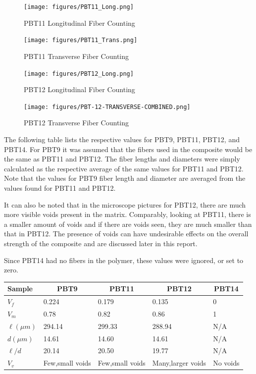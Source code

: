 \documentclass[11pt]{article}
\begin{document}
\begin{figure}[H]
\centering
\texttt{[image: figures/PBT11\_Long.png]}
\caption{PBT11 Longitudinal Fiber Counting}
\label{pbt11longcount}
\end{figure}
\begin{figure}[H]
\centering
\texttt{[image: figures/PBT11\_Trans.png]}
\caption{PBT11 Transverse Fiber Counting}
\label{pbt11transcount}
\end{figure}
\begin{figure}[H]
\centering
\texttt{[image: figures/PBT12\_Long.png]}
\caption{PBT12 Longitudinal Fiber Counting}
\label{pbt12longcount}
\end{figure}
\begin{figure}[H]
\centering
\texttt{[image: figures/PBT-12-TRANSVERSE-COMBINED.png]}
\caption{PBT12 Transverse Fiber Counting}
\label{pbt12transcount}
\end{figure}

The following table lists the respective values for PBT9, PBT11, PBT12, and PBT14. For PBT9 it was assumed that the fibers used in the composite would be the same as PBT11 and PBT12. The fiber lengths and diameters were simply calculated as the respective average of the same values for PBT11 and PBT12.  Note that the values for PBT9 fiber length and diameter are averaged from the values found for PBT11 and PBT12.

It can also be noted that in the microscope pictures for PBT12, there are much more visible voids present in the matrix. Comparably, looking at PBT11, there is a smaller amount of voids and if there are voids seen, they are much smaller than that in PBT12. The presence of voids can have undesirable effects on the overall strength of the composite and are discussed later in this report. 

Since PBT14 had no fibers in the polymer, these values were ignored, or set to zero.
\onehalfspacing
\begin{center}
 \label{tab:MeasuredValues}
\begin{tabular}{p{1.5cm} || p{} | p{} | p{} | p{}}
\hline
Sample & \multicolumn{1}{c|}{PBT9} & \multicolumn{1}{c|}{PBT11} & \multicolumn{1}{c|}{PBT12} & \multicolumn{1}{c}{PBT14} \\
\hline
\hline
\(V_f\) & 0.224 & 0.179 & 0.135 & 0\\
\(V_m\) & 0.78 & 0.82 & 0.86 & 1 \\
\(\ell (\mu m)\) & 294.14 & 299.33 & 288.94 & N/A\\
\(d (\mu m) \) & 14.61 & 14.60 & 14.61 & N/A\\
\(\ell /d\) & 20.14 & 20.50 & 19.77 & N/A\\
\(V_v\) & Few,small voids & Few,small voids & Many,larger voids & No voids\\
\hline
\end{tabular}
\end{center}
\singlespacing
\vspace{1em}
\end{document}
